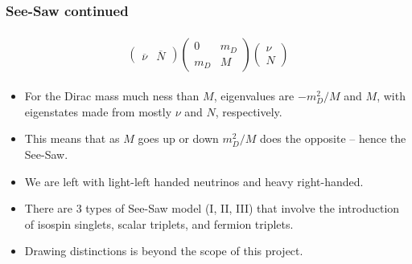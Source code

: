 \documentclass[mathserif,18pt,xcolor=table]{beamer}
\begin{document}
\begin{frame}
  \frametitle{See-Saw continued}
  \begin{align}
    \begin{split}
    \begin{pmatrix}
      \overline{\nu} & \overline{N}
    \end{pmatrix}
    \begin{pmatrix}
      0 & m_D \\
      m_D & M
    \end{pmatrix}
    \begin{pmatrix}
      \nu \\ N
    \end{pmatrix}
    \end{split}
  \end{align}
  \begin{itemize}
    \item For the Dirac mass much ness than $M$, eigenvalues are $-m_D^2/M$ and $M$, with eigenstates made from mostly $\nu$ and $N$, respectively.
    \item This means that as $M$ goes up or down $m_D^2/M$ does the opposite -- hence the See-Saw.
    \item We are left with light-left handed neutrinos and heavy right-handed.
    \item There are 3 types of See-Saw model (I, II, III) that involve the introduction of isospin singlets, scalar triplets, and fermion triplets.
    \item Drawing distinctions is beyond the scope of this project.
  \end{itemize}
\end{frame}
\end{document}
